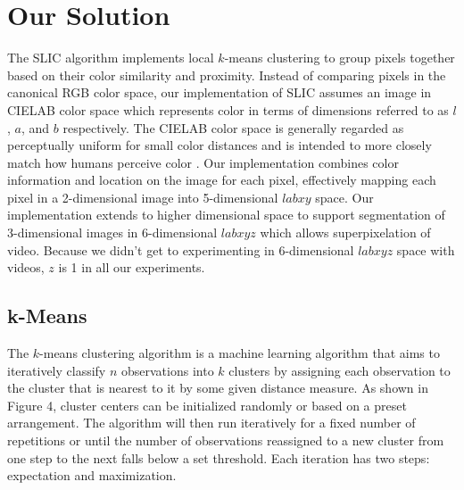 \documentclass[11pt,twocolumn]{article}
\begin{document}
\section {Our Solution}\label{soln}

The SLIC algorithm implements local $k$-means clustering to group pixels together based on their color similarity and proximity. Instead of comparing pixels in the canonical RGB color space, our implementation of SLIC assumes an image in CIELAB color space which represents color in terms of dimensions referred to as $l$, $a$, and $b$ respectively. The CIELAB color space is generally regarded as perceptually uniform for small color distances and is intended to more closely match how humans perceive color \cite{slic}. Our implementation combines color information and location on the image for each pixel, effectively mapping each pixel in a 2-dimensional image into 5-dimensional $labxy$ space. Our implementation extends to higher dimensional space to support segmentation of 3-dimensional images in 6-dimensional $labxyz$ which allows superpixelation of video. Because we didn't get to experimenting in 6-dimensional $labxyz$ space with videos, $z$ is 1 in all our experiments. 

\subsection{k-Means}\label{kmeans}
The $k$-means clustering algorithm is a machine learning algorithm that aims to iteratively classify $n$ observations into $k$ clusters by assigning each observation to the cluster that is nearest to it by some given distance measure. As shown in Figure 4, cluster centers can be initialized randomly or based on a preset arrangement. The algorithm will then run iteratively for a fixed number of repetitions or until the number of observations reassigned to a new cluster from one step to the next falls below a set threshold. Each iteration has two steps:  expectation and maximization.
\end{document}

